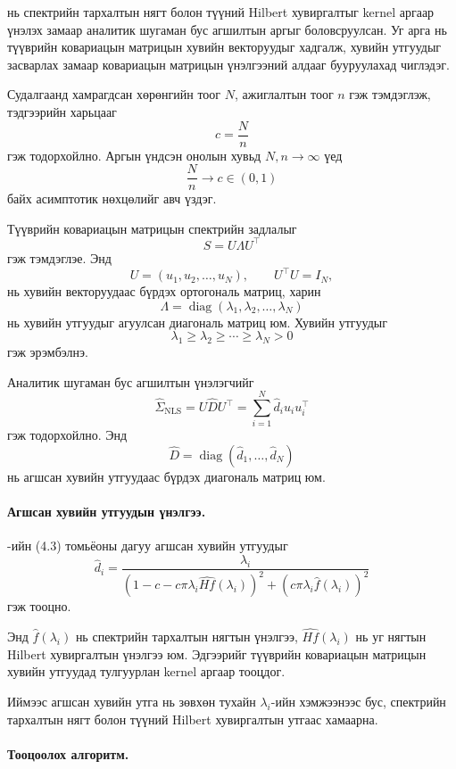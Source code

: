 \citet{ledoitwolf2020} нь спектрийн тархалтын
нягт болон түүний Hilbert хувиргалтыг kernel
аргаар үнэлэх замаар аналитик шугаман бус
агшилтын аргыг боловсруулсан. Уг арга нь
түүврийн ковариацын матрицын хувийн
векторуудыг хадгалж, хувийн утгуудыг
засварлах замаар ковариацын матрицын
үнэлгээний алдааг бууруулахад чиглэдэг.

Судалгаанд хамрагдсан хөрөнгийн тоог $N$,
ажиглалтын тоог $n$ гэж тэмдэглэж,
тэдгээрийн харьцааг
\[
c=\frac{N}{n}
\]
гэж тодорхойлно. Аргын үндсэн онолын хувьд
$N,n\to\infty$ үед
\[
\frac{N}{n}\longrightarrow c\in(0,1)
\]
байх асимптотик нөхцөлийг авч үздэг.

Түүврийн ковариацын матрицын спектрийн
задлалыг
\[
S=U\Lambda U^{\top}
\]
гэж тэмдэглэе. Энд
\[
U=(u_1,u_2,\ldots,u_N),
\qquad
U^{\top}U=I_N,
\]
нь хувийн векторуудаас бүрдэх ортогональ
матриц, харин
\[
\Lambda
=
\operatorname{diag}
(\lambda_1,\lambda_2,\ldots,\lambda_N)
\]
нь хувийн утгуудыг агуулсан диагональ
матриц юм. Хувийн утгуудыг
\[
\lambda_1\geq\lambda_2\geq\cdots
\geq\lambda_N>0
\]
гэж эрэмбэлнэ.

Аналитик шугаман бус агшилтын үнэлэгчийг
\[
\widehat{\Sigma}_{\mathrm{NLS}}
=
U\widehat{D}U^{\top}
=
\sum_{i=1}^{N}
\widehat{d}_i u_i u_i^{\top}
\]
гэж тодорхойлно. Энд
\[
\widehat{D}
=
\operatorname{diag}
(\widehat{d}_1,\ldots,\widehat{d}_N)
\]
нь агшсан хувийн утгуудаас бүрдэх
диагональ матриц юм.

\paragraph{Агшсан хувийн утгуудын үнэлгээ.}

\citet{ledoitwolf2020}-ийн (4.3) томьёоны
дагуу агшсан хувийн утгуудыг
\[
\widehat{d}_i
=
\frac{\lambda_i}
{
	\left(
	1-c-c\pi\lambda_i
	\widehat{Hf}(\lambda_i)
	\right)^2
	+
	\left(
	c\pi\lambda_i
	\widehat{f}(\lambda_i)
	\right)^2
}
\]
гэж тооцно.

Энд $\widehat{f}(\lambda_i)$ нь
спектрийн тархалтын нягтын үнэлгээ,
$\widehat{Hf}(\lambda_i)$ нь уг нягтын
Hilbert хувиргалтын үнэлгээ юм.
Эдгээрийг түүврийн ковариацын матрицын
хувийн утгуудад тулгуурлан kernel
аргаар тооцдог.

Иймээс агшсан хувийн утга нь зөвхөн
тухайн $\lambda_i$-ийн хэмжээнээс бус,
спектрийн тархалтын нягт болон түүний
Hilbert хувиргалтын утгаас хамаарна.

\paragraph{Тооцоолох алгоритм.}

